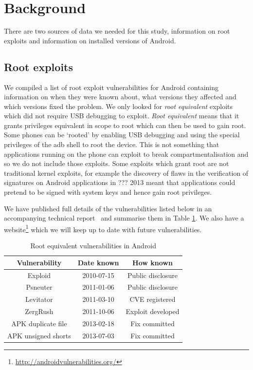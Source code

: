 \documentclass[conference,a4paper,twoside]{IEEEtran}
\begin{document}
\section{Background}
\label{sec:background}
There are two sources of data we needed for this study, information on root exploits and information on installed versions of Android.

\subsection{Root exploits}
We compiled a list of root exploit vulnerabilities for Android containing information on when they were known about, what versions they affected and which versions fixed the problem.
We only looked for \emph{root equivalent} exploits which did not require USB debugging to exploit.
\emph{Root equivalent} means that it grants privileges equivalent in scope to root which can then be used to gain root.
Some phones can be `rooted' by enabling USB debugging and using the special privileges of the adb shell to root the device.
This is not something that applications running on the phone can exploit to break compartmentalisation and so we do not include those exploits.
Some exploits which grant root are not traditional kernel exploits, for example the discovery of flaws in the verification of signatures on Android applications in ??? 2013 meant that applications could pretend to be signed with system keys and hence gain root privileges.

We have published full details of the vulnerabilities listed below in an accompanying technical report~\cite{TODO} and summarise them in Table \ref{tab:andvulns}.
We also have a website\footnote{\url{http://androidvulnerabilities.org/}} which we will keep up to date with future vulnerabilities.

\begin{table}
\centering
\begin{tabular}{c|c|c}
Vulnerability & Date known & How known \\
\hline
Exploid & 2010-07-15 & Public disclosure \\
Psneuter & 2011-01-06 & Public disclosure \\
Levitator & 2011-03-10 & CVE registered \\
ZergRush & 2011-10-06 & Exploit developed \\
APK duplicate file & 2013-02-18 & Fix committed \\
APK unsigned shorts & 2013-07-03 & Fix committed \\
\end{tabular}
\caption{Root equivalent vulnerabilities in Android}
\label{tab:andvulns}
\end{table}
\end{document}

